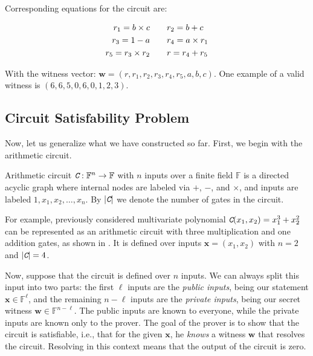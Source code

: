 \documentclass[../lecture-notes.tex]{subfiles}
\begin{document}
Corresponding equations for the circuit are:

\begin{equation*}
    \begin{aligned}
        r_1 = b \times c \hspace{10px} & & &
        r_2 = b + c \\
        r_3 = 1 - a \hspace{10px} & & &
        r_4 = a \times r_1 \\
        r_5 = r_3 \times r_2 \hspace{10px} & & &
        r = r_4 + r_5 \\
    \end{aligned}
\end{equation*}

With the witness vector: $\mathbf{w} = (r, r_1, r_2, r_3, r_4, r_5, a , b, c)$. One example of a valid witness is $(6, 6, 5, 0, 6, 0, 1, 2, 3)$.

\subsection{Circuit Satisfability Problem}

Now, let us generalize what we have constructed so far. First, we begin with the arithmetic circuit.

\begin{definition}
    Arithmetic circuit $\textit{\texttt{C}}: \mathbb{F}^n \to \mathbb{F}$ with $n$ inputs over a finite field $\mathbb{F}$ is a directed acyclic graph where internal nodes are labeled via $+$, $-$, and $\times$, and inputs are labeled $1,x_1,x_2,\dots,x_n$. By $|\textit{\texttt{C}}|$ we denote the number of gates in the circuit.
\end{definition}

\begin{example}
    For example, previously considered multivariate polynomial $\textit{\texttt{C}}(x_1,x_2) = x_1^3 + x_2^2$ can be represented as an arithmetic circuit with three multiplication and one addition gates, as shown in . It is defined over inputs $\mathbf{x}=(x_1,x_2)$ with $n=2$ and $|\textit{\texttt{C}}| = 4$.
\end{example}

Now, suppose that the circuit is defined over $n$ inputs. We can always split this input into two parts: the first $\ell$ inputs are the \textit{public inputs}, being our statement $\mathbf{x} \in \mathbb{F}^{\ell}$, and the remaining $n-\ell$ inputs are the \textit{private inputs}, being our secret witness $\mathbf{w} \in \mathbb{F}^{n-\ell}$. The public inputs are known to everyone, while the private inputs are known only to the prover. The goal of the prover is to show that the circuit is satisfiable, i.e., that for the given $\mathbf{x}$, he \textit{knows} a witness $\mathbf{w}$ that resolves the circuit. Resolving in this context means that the output of the circuit is zero.
\end{document}
